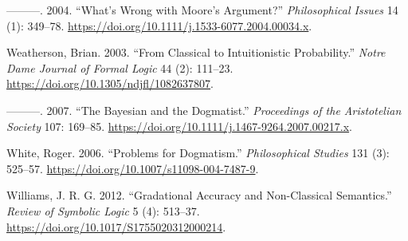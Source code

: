 \documentclass[
  11pt,
  letterpaper,
  DIV=11,
  numbers=noendperiod,
  oneside]{scrartcl}
\newlength{\cslhangindent}
\newenvironment{CSLReferences}[2] %
 {\begin{list}{}{%
  \setlength{\itemindent}{0pt}
  \setlength{\leftmargin}{0pt}
  \setlength{\parsep}{0pt}
  \ifodd #1
   \setlength{\leftmargin}{\cslhangindent}
   \setlength{\itemindent}{-1\cslhangindent}
  \fi
  \setlength{\itemsep}{#2\baselineskip}}}
 {\end{list}}
\begin{document}
\begin{CSLReferences}{1}{0}
---------. 2004. {``What's Wrong with Moore's Argument?''}
\emph{Philosophical Issues} 14 (1): 349--78.
\url{https://doi.org/10.1111/j.1533-6077.2004.00034.x}.

Weatherson, Brian. 2003. {``From Classical to Intuitionistic
Probability.''} \emph{Notre Dame Journal of Formal Logic} 44 (2):
111--23. \url{https://doi.org/10.1305/ndjfl/1082637807}.

---------. 2007. {``The Bayesian and the Dogmatist.''} \emph{Proceedings
of the Aristotelian Society} 107: 169--85.
\url{https://doi.org/10.1111/j.1467-9264.2007.00217.x}.

White, Roger. 2006. {``Problems for Dogmatism.''} \emph{Philosophical
Studies} 131 (3): 525--57.
\url{https://doi.org/10.1007/s11098-004-7487-9}.

Williams, J. R. G. 2012. {``Gradational Accuracy and Non-Classical
Semantics.''} \emph{Review of Symbolic Logic} 5 (4): 513--37.
\url{https://doi.org/10.1017/S1755020312000214}.

\end{CSLReferences}
\end{document}
